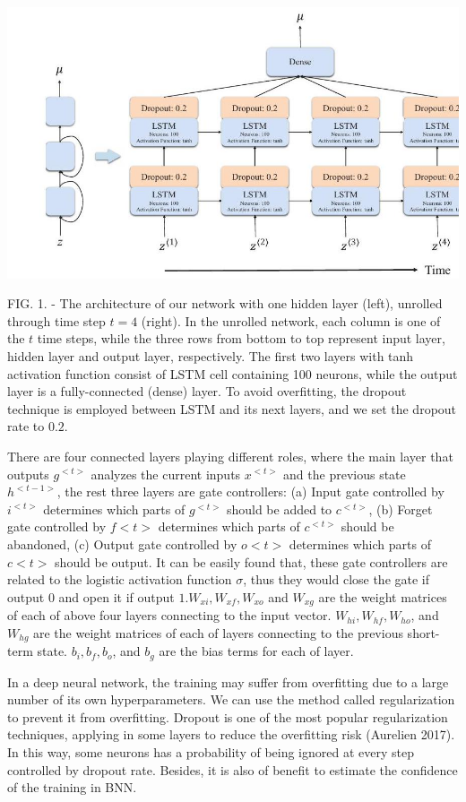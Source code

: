 \documentclass[10pt, a4paper]{article}
\begin{document}
\includegraphics[max width=\textwidth]{NetworkArchitecture.jpg}

FIG. 1. - The architecture of our network with one hidden layer (left), unrolled through time step $t=4$ (right). In the unrolled network, each column is one of the $t$ time steps, while the three rows from bottom to top represent input layer, hidden layer and output layer, respectively. The first two layers with tanh activation function consist of LSTM cell containing 100 neurons, while the output layer is a fully-connected (dense) layer. To avoid overfitting, the dropout technique is employed between LSTM and its next layers, and we set the dropout rate to $0.2$.


There are four connected layers playing different roles, where the main layer that outputs $g^{<t>}$ analyzes the current inputs $x^{<t>}$ and the previous state $h^{<t-1>}$, the rest three layers are gate controllers: (a) Input gate controlled by $i^{<t>}$ determines which parts of $g^{<t>}$ should be added to $c^{<t>}$, (b) Forget gate controlled by $f<t>$ determines which parts of $c^{<t>}$ should be abandoned, (c) Output gate controlled by $o<t>$ determines which parts of $c<t>$ should be output. It can be easily found that, these gate controllers are related to the logistic activation function $\sigma$, thus they would close the gate if output 0 and open it if output $1 . W_{x i}, W_{x f}, W_{x o}$ and $W_{x g}$ are the weight matrices of each of above four layers connecting to the input vector. $W_{h i}, W_{h f}, W_{h o}$, and $W_{h g}$ are the weight matrices of each of layers connecting to the previous short-term state. $b_{i}, b_{f}, b_{o}$, and $b_{g}$ are the bias terms for each of layer.

In a deep neural network, the training may suffer from overfitting due to a large number of its own hyperparameters. We can use the method called regularization to prevent it from overfitting. Dropout is one of the most popular regularization techniques, applying in some layers to reduce the overfitting risk (Aurelien 2017). In this way, some neurons has a probability of being ignored at every step controlled by dropout rate. Besides, it is also of benefit to estimate the confidence of the training in BNN.
\end{document}
